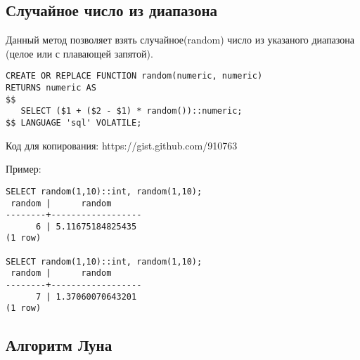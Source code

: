 \subsection{Случайное число из диапазона}
\begin{framed}
Данный метод позволяет взять случайное(random) число из указаного диапазона (целое или с плавающей запятой).
\end{framed}

\begin{lstlisting}[label=lst:snippets8,caption=Случайное число из диапазона. SQL запрос]
CREATE OR REPLACE FUNCTION random(numeric, numeric)
RETURNS numeric AS
$$
   SELECT ($1 + ($2 - $1) * random())::numeric;
$$ LANGUAGE 'sql' VOLATILE;
\end{lstlisting}

Код для копирования: https://gist.github.com/910763

Пример:
\begin{lstlisting}[label=lst:snippets9,caption=Случайное число из диапазона. Пример]
SELECT random(1,10)::int, random(1,10);
 random |      random      
--------+------------------
      6 | 5.11675184825435
(1 row)

SELECT random(1,10)::int, random(1,10);
 random |      random      
--------+------------------
      7 | 1.37060070643201
(1 row)
\end{lstlisting}

\subsection{Алгоритм Луна}

